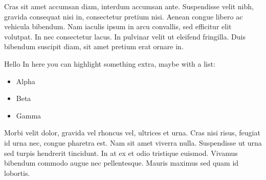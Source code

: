 \documentclass{OP-Whitepaper}
\begin{document}
\begin{multicols}{3}
Cras sit amet accumsan diam, interdum accumsan ante. Suspendisse velit nibh, gravida consequat nisi in, consectetur pretium nisi. Aenean congue libero ac vehicula bibendum. Nam iaculis ipsum in arcu convallis, sed efficitur elit volutpat. In nec consectetur lacus. In pulvinar velit ut eleifend fringilla. Duis bibendum suscipit diam, sit amet pretium erat ornare in.

\begin{extrabox}{Hello}
In here you can highlight something extra, maybe with a list:

\begin{itemize}
    \item Alpha
    \item Beta
    \item Gamma
\end{itemize}
\end{extrabox}

Morbi velit dolor, gravida vel rhoncus vel, ultrices et urna. Cras nisi risus, feugiat id urna nec, congue pharetra est. Nam sit amet viverra nulla. Suspendisse ut urna sed turpis hendrerit tincidunt. In at ex et odio tristique euismod. Vivamus bibendum commodo augue nec pellentesque. Mauris maximus sed quam id lobortis.

\end{multicols}
\pagebreak
\end{document}

